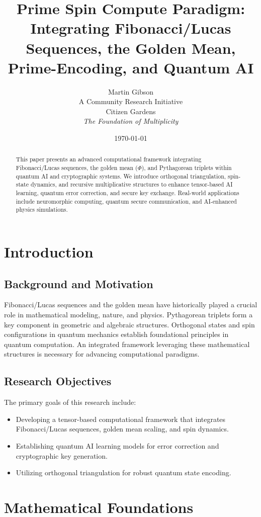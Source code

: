 \documentclass{article}
\title{Prime Spin Compute Paradigm: Integrating Fibonacci/Lucas Sequences, the Golden Mean, Prime-Encoding, and Quantum AI}
\author{Martin Gibson \\ A Community Research Initiative\\ Citizen Gardens \\ \textit{The Foundation of Multiplicity}}
\date{\today}
\theoremstyle{plain}
\begin{document}
\maketitle

\begin{abstract}
This paper presents an advanced computational framework integrating Fibonacci/Lucas sequences, the golden mean ($\Phi$), and Pythagorean triplets within quantum AI and cryptographic systems. We introduce orthogonal triangulation, spin-state dynamics, and recursive multiplicative structures to enhance tensor-based AI learning, quantum error correction, and secure key exchange. Real-world applications include neuromorphic computing, quantum secure communication, and AI-enhanced physics simulations.
\end{abstract}

\section{Introduction}
\subsection{Background and Motivation}
Fibonacci/Lucas sequences and the golden mean have historically played a crucial role in mathematical modeling, nature, and physics. Pythagorean triplets form a key component in geometric and algebraic structures. Orthogonal states and spin configurations in quantum mechanics establish foundational principles in quantum computation. An integrated framework leveraging these mathematical structures is necessary for advancing computational paradigms.

\subsection{Research Objectives}
The primary goals of this research include:
\begin{itemize}
    \item Developing a tensor-based computational framework that integrates Fibonacci/Lucas sequences, golden mean scaling, and spin dynamics.
    \item Establishing quantum AI learning models for error correction and cryptographic key generation.
    \item Utilizing orthogonal triangulation for robust quantum state encoding.
\end{itemize}

\section{Mathematical Foundations}
\end{document}
